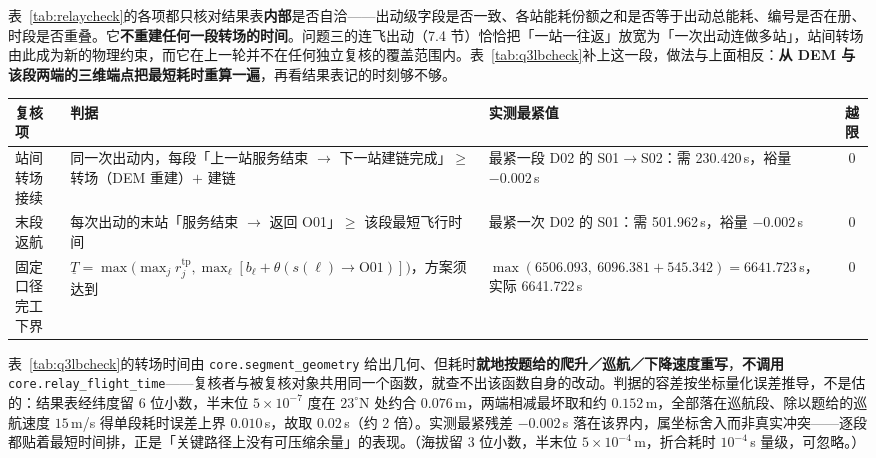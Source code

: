 表~\ref{tab:relaycheck}的各项都只核对结果表\textbf{内部}是否自洽——出动级字段是否一致、各站能耗份额之和是否等于出动总能耗、编号是否在册、时段是否重叠。它\textbf{不重建任何一段转场的时间}。问题三的连飞出动（7.4 节）恰恰把「一站一往返」放宽为「一次出动连做多站」，站间转场由此成为新的物理约束，而它在上一轮并不在任何独立复核的覆盖范围内。表~\ref{tab:q3lbcheck}补上这一段，做法与上面相反：\textbf{从 DEM 与该段两端的三维端点把最短耗时重算一遍}，再看结果表记的时刻够不够。

\begin{center}
\begin{minipage}{\textwidth}
	\label{tab:q3lbcheck}
	\centering
	\begin{tabularx}{0.98\textwidth}{lXXc}
		\toprule
		复核项 & 判据 & 实测最紧值 & 越限 \\
		\midrule
		站间转场接续 & 同一次出动内，每段「上一站服务结束 $\to$ 下一站建链完成」$\ge$ 转场（DEM 重建）$+$ 建链 & 最紧一段 D02 的 S01$\to$S02：需 230.420\,s，裕量 $-0.002$\,s & 0 \\
		末段返航 & 每次出动的末站「服务结束 $\to$ 返回 O01」$\ge$ 该段最短飞行时间 & 最紧一次 D02 的 S01：需 501.962\,s，裕量 $-0.002$\,s & 0 \\
		固定口径完工下界 & $\underline{T}=\max\bigl(\max_j r_j^{\mathrm{tp}},\max_\ell[b_\ell+\theta(s(\ell)\to\mathrm{O01})]\bigr)$，方案须达到 & $\max(6506.093,\ 6096.381+545.342)=6641.723$\,s，实际 6641.722\,s & 0 \\
		\bottomrule
	\end{tabularx}
\end{minipage}
\end{center}

表~\ref{tab:q3lbcheck}的转场时间由 \texttt{core.segment\_geometry} 给出几何、但耗时\textbf{就地按题给的爬升／巡航／下降速度重写}，\textbf{不调用} \texttt{core.relay\_flight\_time}——复核者与被复核对象共用同一个函数，就查不出该函数自身的改动。判据的容差按坐标量化误差推导，不是估的：结果表经纬度留 6 位小数，半末位 $5\times10^{-7}$ 度在 $23^\circ$N 处约合 $0.076$\,m，两端相减最坏取和约 $0.152$\,m，全部落在巡航段、除以题给的巡航速度 $15$\,m/s 得单段耗时误差上界 $0.010$\,s，故取 $0.02$\,s（约 2 倍）。实测最紧残差 $-0.002$\,s 落在该界内，属坐标舍入而非真实冲突——逐段都贴着最短时间排，正是「关键路径上没有可压缩余量」的表现。（海拔留 3 位小数，半末位 $5\times10^{-4}$\,m，折合耗时 $10^{-4}$\,s 量级，可忽略。）

